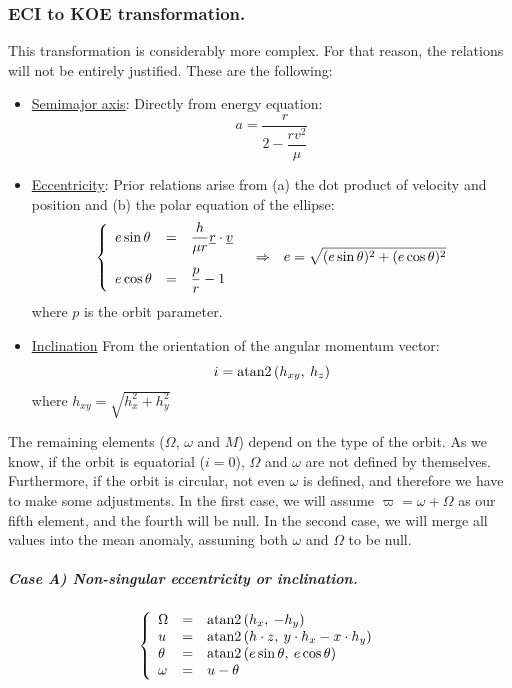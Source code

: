 		\subsubsection{ECI to KOE transformation.}
		\indent This transformation is considerably more complex. For that reason, the relations will not be entirely justified. These are the following:
		\begin{itemize}
		\item \underline{Semimajor axis}: Directly from energy equation:
		\[
		a = \dfrac{r}{2 - \dfrac{r v^2}{\mu}}
		\]
		\item \underline{Eccentricity}: Prior relations arise from (a) the dot product of velocity and position and (b) the polar equation of the ellipse:
		\[
		\begin{array}{ccc}
		\left\{ \begin{array}{lll}
		e\sin\theta & = & \dfrac{h}{\mu r} \underline{r} \cdot \underline{v}\\[1.5em]
		e\cos\theta & = & \dfrac{p}{r} - 1
		\end{array}\right. 
		&
		\Rightarrow
		& 
		e = \displaystyle\sqrt{(e\sin\theta)^2 + (e\cos\theta)^2}
		\end{array}
		\]
		\noindent where $p$ is the orbit parameter.
		\item \underline{Inclination} From the orientation of the angular momentum vector:
		\[
		i = \text{atan2}\left( h_{xy},\: h_z \right)
		\]
		\noindent where $h_{xy} = \sqrt{h_x^2 + h_y^2}$
		\end{itemize}
		\indent The remaining elements ($\Omega$, $\omega$ and $M$) depend on the type of the orbit. As we know, if the orbit is equatorial ($i=0$), $\Omega$ and $\omega$ are not defined by themselves. Furthermore, if the orbit is circular, not even $\omega$ is defined, and therefore we have to make some adjustments. In the first case, we will assume $\varpi = \omega + \Omega $ as our fifth element, and the fourth will be null. In the second case, we will merge all values into the mean anomaly, assuming both $\omega$ and $\Omega$ to be null.\\
		\subparagraph{Case A) Non-singular eccentricity or inclination.\\}
		\[
		\left\{
		\begin{array}{lll}
		\Omega 	& = & \text{atan2}\left( h_x,\: -h_y\right)\\
		u 		& = & \text{atan2}\left( h \cdot z,\: y\cdot h_x - x \cdot h_y\right)\\
		\theta 	& = & \text{atan2}\left(e\sin\theta,\: e\cos\theta\right)\\
		\omega 	& = & u - \theta
		\end{array}\right.
		\]
